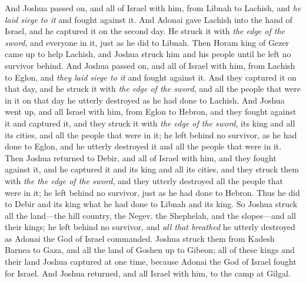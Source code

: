 \begin{biblechapter}
\verse And Joshua passed on, and all of Israel with him, from Libnah to Lachish, and \textit{he laid siege to it} and fought against it.
\verse And Adonai gave Lachish into the hand of Israel, and he captured it on the second day. He struck it with \textit{the edge of the sword}, and everyone in it, just as he did to Libnah.
\verse Then Horam king of Gezer came up to help Lachish, and Joshua struck him and his people until he left no survivor behind.
\verse And Joshua passed on, and all of Israel with him, from Lachish to Eglon, and \textit{they laid siege to it} and fought against it.
\verse And they captured it on that day, and he struck it with \textit{the edge of the sword}, and all the people that were in it on that day he utterly destroyed as he had done to Lachish.
\verse And Joshua went up, and all Israel with him, from Eglon to Hebron, and they fought against it
\verse and captured it, and they struck it with \textit{the edge of the sword}, its king and all its cities, and all the people that were in it; he left behind no survivor, as he had done to Eglon, and he utterly destroyed it and all the people that were in it.
\verse Then Joshua returned to Debir, and all of Israel with him, and they fought against it,
\verse and he captured it and its king and all its cities, and they struck them with \textit{the the edge of the sword}, and they utterly destroyed all the people that were in it; he left behind no survivor, just as he had done to Hebron. Thus he did to Debir and its king what he had done to Libnah and its king.
\verse So Joshua struck all the land—the hill country, the Negev, the Shephelah, and the slopes—and all their kings; he left behind no survivor, and \textit{all that breathed} he utterly destroyed as Adonai the God of Israel commanded.
\verse Joshua struck them from Kadesh Barnea to Gaza, and all the land of Goshen up to Gibeon;
\verse all of these kings and their land Joshua captured at one time, because Adonai the God of Israel fought for Israel.
\verse And Joshua returned, and all Israel with him, to the camp at Gilgal.
\end{biblechapter}

